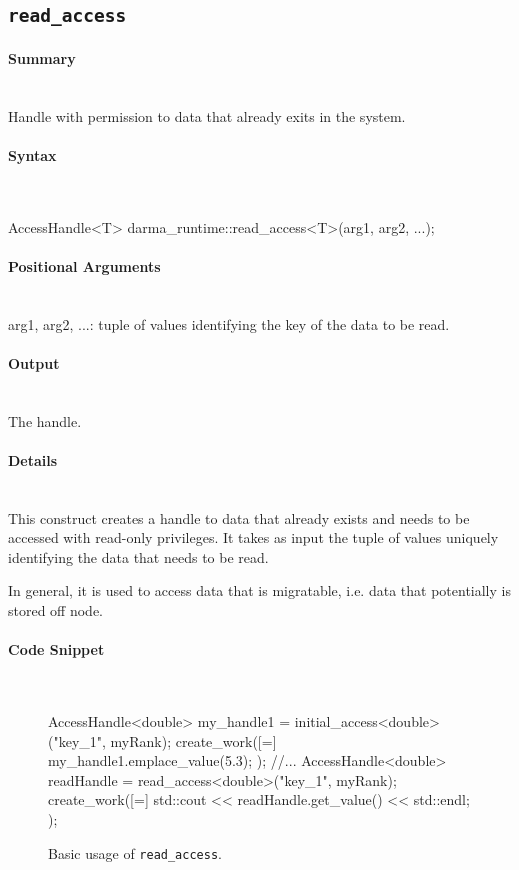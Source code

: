 \subsection{\texttt{read\_access}}

\paragraph{Summary}\mbox{}\\
Handle with  permission to data that already exits in the system. 

\paragraph{Syntax}\mbox{}\\
\begin{CppCode}
AccessHandle<T> darma_runtime::read_access<T>(arg1, arg2, ...);
\end{CppCode}

\paragraph{Positional Arguments}\mbox{}\\
arg1, arg2, ...: tuple of values identifying the key of the data to be read.

\paragraph{Output}\mbox{}\\
The handle.  

\paragraph{Details}\mbox{}\\
This construct creates a handle to data that already exists and 
needs to be accessed with read-only privileges. 
It takes as input the tuple of values uniquely 
identifying the data that needs to be read. 

In general, it is used to access data that is migratable, i.e. data 
that potentially is stored off node.


\paragraph{Code Snippet}\mbox{}\\
\begin{figure}[!h]
\begin{CppCodeNumb}
AccessHandle<double> my_handle1 = initial_access<double>("key_1", myRank);
create_work([=]{
	my_handle1.emplace_value(5.3);
});
//...
AccessHandle<double> readHandle = read_access<double>("key_1", myRank);
create_work([=]{
	std::cout << readHandle.get_value() << std::endl;
});
\end{CppCodeNumb}
\label{fig:fe_api_readaccess}
\caption{Basic usage of \texttt{read\_access}.}
\end{figure}



